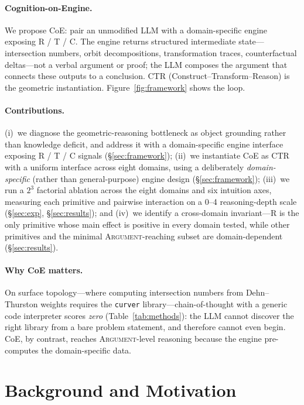 \documentclass{article}
\begin{document}
\paragraph{Cognition-on-Engine.}
We propose CoE: pair an unmodified LLM with a domain-specific engine exposing R / T / C.
The engine returns structured intermediate state---intersection numbers, orbit
decompositions, transformation traces, counterfactual deltas---not a verbal argument
or proof; the LLM composes the argument that connects these outputs to a conclusion.
CTR (Construct--Transform--Reason) is the geometric instantiation.
Figure~\ref{fig:framework} shows the loop.

\paragraph{Contributions.}
(i)~we diagnose the geometric-reasoning bottleneck as object grounding rather
than knowledge deficit, and address it with a domain-specific engine interface
exposing R / T / C signals (\S\ref{sec:framework});
(ii)~we instantiate CoE as CTR with a uniform interface across eight domains, using a
deliberately \emph{domain-specific} (rather than general-purpose) engine design
(\S\ref{sec:framework});
(iii)~we run a $2^3$ factorial ablation across the eight domains and six intuition
axes, measuring each primitive and pairwise interaction on a 0--4 reasoning-depth
scale (\S\ref{sec:exp}, \S\ref{sec:results}); and
(iv)~we identify a cross-domain invariant---R is the only primitive whose main effect
is positive in every domain tested, while other primitives and the minimal
\textsc{Argument}-reaching subset are domain-dependent (\S\ref{sec:results}).

\paragraph{Why CoE matters.}
On surface topology---where computing intersection numbers from
Dehn--Thurston weights requires the \texttt{curver} library---chain-of-thought
with a generic code interpreter scores \emph{zero}
(Table~\ref{tab:methods}): the LLM cannot discover the right library from a
bare problem statement, and therefore cannot even begin. CoE, by contrast,
reaches \textsc{Argument}-level reasoning because the engine pre-computes
the domain-specific data.

\section{Background and Motivation}
\label{sec:background}
\end{document}
